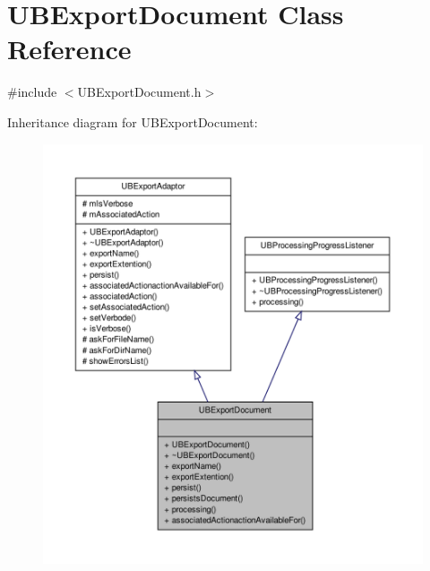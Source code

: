 \hypertarget{class_u_b_export_document}{\section{U\-B\-Export\-Document Class Reference}
\label{d9/d32/class_u_b_export_document}
}


{\ttfamily \#include $<$U\-B\-Export\-Document.\-h$>$}



Inheritance diagram for U\-B\-Export\-Document\-:
\nopagebreak
\begin{figure}[H]
\begin{center}
\leavevmode
\includegraphics[width=350pt]{df/dfa/class_u_b_export_document__inherit__graph}
\end{center}
\end{figure}



